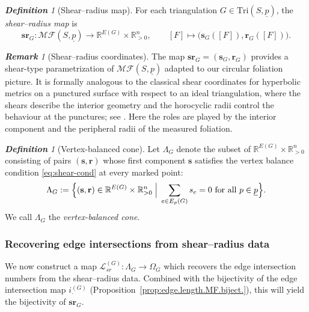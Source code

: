\documentclass[11pt, letterpaper]{amsart}
\theoremstyle{definition}
\theoremstyle{remark}
\newtheorem{definition}[theorem]{\rm\bf Definition}
\newtheorem{remark}[theorem]{\rm\bf Remark}
\newcommand{\up}{\underline{p}}
\newcommand{\Sp}{(S,\up)}
\newcommand{\TSp}{\text{Tri}\Sp}
\newcommand{\iG}{i^{(G)}}
\newcommand{\cMFp}{\mathcal{MF} (S,\up)}
\newcommand{\bR}{\mathbb{R}}
\newcommand{\DEF}{} \newcommand{\WARN}{\textcolor{red}} \newcommand{\ALT}{\textcolor{brown}} \newcommand{\TODO}{\textcolor{teal}} %
\numberwithin{equation}{section}
\begin{document}
\begin{definition}[Shear--radius map]
\label{def:MF-shear-radius}
For each triangulation \(G\in\TSp\), the \DEF{\em shear--radius map} is
\[
\mathbf{sr}_G : \cMFp \longrightarrow \bR^{E(G)} \times \bR_{>0}^n, \qquad
[F] \longmapsto \bigl(\mathbf{s}_G([F]),\mathbf{r}_G([F])\bigr).
\]
\end{definition}

\begin{remark}[Shear--radius coordinates]
\label{rem:MF.sr.coordinates}
The map \(\mathbf{sr}_G = (\mathbf{s}_G,\mathbf{r}_G)\) provides a shear-type parametrization of \(\cMFp\) adapted to our circular foliation picture.
It is formally analogous to the classical shear coordinates for hyperbolic metrics on a punctured surface with respect to an ideal triangulation, where the shears describe the interior geometry and the horocyclic radii control the behaviour at the punctures; see \cite{PP93,PP05,Bon96,CF24}.
Here the roles are played by the interior component and the peripheral radii of the measured foliation.
\end{remark}

\begin{definition}[Vertex-balanced cone]
    \label{def:vertex.balanc.part}
    Let \(\Lambda_G\) denote the subset of \(\bR^{E(G)} \times \bR^n_{>0}\) consisting of pairs \((\mathbf{s},\mathbf{r})\) whose first component \(\mathbf{s}\) satisfies the vertex balance condition \eqref{eq:shear-cond} at every marked point:
    \[
    \Lambda_G := \Bigl\{ (\mathbf{s},\mathbf{r}) \in \bR^{E(G)} \times \bR^n_{>0} \;\Big|\;
    \sum_{e\in E_p(G)} s_e = 0 \text{ for all } p\in\up \Bigr\}.
    \]
    We call \(\Lambda_G\) the \DEF{\em vertex-balanced cone}.
\end{definition}

\subsubsection{Recovering edge intersections from shear–radius data}

We now construct a map \(\mathcal{L}^{(G)}_{sr}:\Lambda_G\to\Omega_G\) which recovers the edge intersection numbers from the shear--radius data.
Combined with the bijectivity of the edge intersection map \(\iG_{\cdot}\) (Proposition~\ref{prop:edge.length.MF.biject.}), this will yield the bijectivity of \(\mathbf{sr}_G\).
\end{document}
